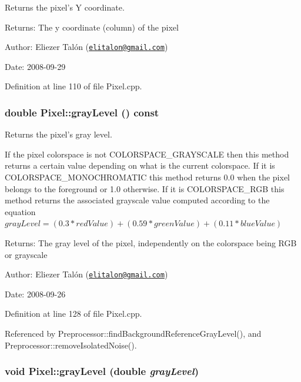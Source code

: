 Returns the pixel's Y coordinate. 

\begin{Desc}
\item[Returns:]The y coordinate (column) of the pixel\end{Desc}
\begin{Desc}
\item[Author:]Eliezer Talón (\href{mailto:elitalon@gmail.com}{\tt elitalon@gmail.com}) \end{Desc}
\begin{Desc}
\item[Date:]2008-09-29 \end{Desc}


Definition at line 110 of file Pixel.cpp.\hypertarget{class_pixel_6e445cee8bfa4475238823e0b6da42b0}{
\subsubsection[grayLevel]{\setlength{\rightskip}{0pt plus 5cm}double Pixel::grayLevel () const}}
\label{class_pixel_6e445cee8bfa4475238823e0b6da42b0}


Returns the pixel's gray level. 

If the pixel colorspace is not COLORSPACE\_\-GRAYSCALE then this method returns a certain value depending on what is the current colorspace. If it is COLORSPACE\_\-MONOCHROMATIC this method returns 0.0 when the pixel belongs to the foreground or 1.0 otherwise. If it is COLORSPACE\_\-RGB this method returns the associated grayscale value computed according to the equation $grayLevel = (0.3 * redValue) + (0.59 * greenValue) + (0.11 * blueValue)$

\begin{Desc}
\item[Returns:]The gray level of the pixel, independently on the colorspace being RGB or grayscale\end{Desc}
\begin{Desc}
\item[Author:]Eliezer Talón (\href{mailto:elitalon@gmail.com}{\tt elitalon@gmail.com}) \end{Desc}
\begin{Desc}
\item[Date:]2008-09-26 \end{Desc}


Definition at line 128 of file Pixel.cpp.

Referenced by Preprocessor::findBackgroundReferenceGrayLevel(), and Preprocessor::removeIsolatedNoise().\hypertarget{class_pixel_03f96954bfc27f8f8810e8c6e58828f8}{
\subsubsection[grayLevel]{\setlength{\rightskip}{0pt plus 5cm}void Pixel::grayLevel (double {\em grayLevel})}}
\label{class_pixel_03f96954bfc27f8f8810e8c6e58828f8}


